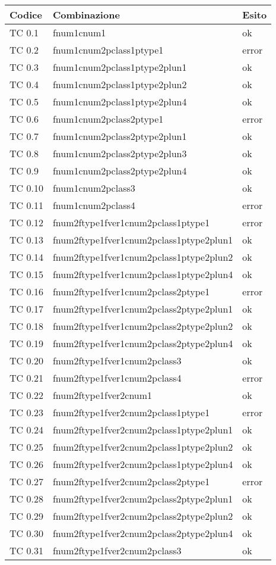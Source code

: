 \clearpage

	\begin{tabular}{|p{3cm}|p{7cm}|p{3cm}|}
		\hline
		\rowcolor{Gray}
		\textbf{Codice} & \textbf{Combinazione} & \textbf{Esito}\tabularnewline
		\hline
		TC 0.1			& fnum1cnum1					& ok \tabularnewline
		\hline
		TC 0.2			& fnum1cnum2pclass1ptype1			& error \tabularnewline
		\hline
		TC 0.3			& fnum1cnum2pclass1ptype2plun1			& ok \tabularnewline
		\hline
		TC 0.4			& fnum1cnum2pclass1ptype2plun2			& ok \tabularnewline
		\hline
		TC 0.5			& fnum1cnum2pclass1ptype2plun4			& ok \tabularnewline
		\hline
		TC 0.6			& fnum1cnum2pclass2ptype1			& error \tabularnewline
		\hline
		TC 0.7			& fnum1cnum2pclass2ptype2plun1			& ok \tabularnewline
		\hline
		TC 0.8			& fnum1cnum2pclass2ptype2plun3			& ok \tabularnewline
		\hline
		TC 0.9			& fnum1cnum2pclass2ptype2plun4			& ok \tabularnewline
		\hline
		TC 0.10			& fnum1cnum2pclass3				& ok \tabularnewline
		\hline
		TC 0.11			& fnum1cnum2pclass4				& error \tabularnewline
		\hline
		TC 0.12			& fnum2ftype1fver1cnum2pclass1ptype1		& error \tabularnewline
		\hline
		TC 0.13			& fnum2ftype1fver1cnum2pclass1ptype2plun1	& ok \tabularnewline
		\hline
		TC 0.14			& fnum2ftype1fver1cnum2pclass1ptype2plun2	& ok \tabularnewline
		\hline
		TC 0.15			& fnum2ftype1fver1cnum2pclass1ptype2plun4	& ok \tabularnewline
		\hline
		TC 0.16			& fnum2ftype1fver1cnum2pclass2ptype1		& error \tabularnewline
		\hline
		TC 0.17			& fnum2ftype1fver1cnum2pclass2ptype2plun1	& ok \tabularnewline
		\hline
		TC 0.18			& fnum2ftype1fver1cnum2pclass2ptype2plun2	& ok \tabularnewline
		\hline
		TC 0.19			& fnum2ftype1fver1cnum2pclass2ptype2plun4	& ok \tabularnewline
		\hline
		TC 0.20			& fnum2ftype1fver1cnum2pclass3			& ok \tabularnewline
		\hline
		TC 0.21			& fnum2ftype1fver1cnum2pclass4			& error \tabularnewline
		\hline
		TC 0.22			& fnum2ftype1fver2cnum1				& ok \tabularnewline
		\hline
		TC 0.23			& fnum2ftype1fver2cnum2pclass1ptype1		& error \tabularnewline
		\hline
		TC 0.24			& fnum2ftype1fver2cnum2pclass1ptype2plun1	& ok \tabularnewline
		\hline
		TC 0.25			& fnum2ftype1fver2cnum2pclass1ptype2plun2	& ok \tabularnewline
		\hline
		TC 0.26			& fnum2ftype1fver2cnum2pclass1ptype2plun4	& ok \tabularnewline
		\hline
		TC 0.27			& fnum2ftype1fver2cnum2pclass2ptype1		& error \tabularnewline
		\hline
		TC 0.28			& fnum2ftype1fver2cnum2pclass2ptype2plun1	& ok \tabularnewline
		\hline
		TC 0.29			& fnum2ftype1fver2cnum2pclass2ptype2plun2	& ok \tabularnewline
		\hline
		TC 0.30			& fnum2ftype1fver2cnum2pclass2ptype2plun4	& ok \tabularnewline
		\hline
		TC 0.31			& fnum2ftype1fver2cnum2pclass3			& ok \tabularnewline

\end{tabular}
